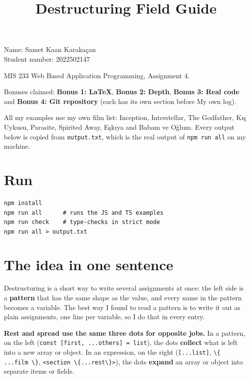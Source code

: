 \documentclass[
]{article}
\title{Destructuring Field Guide}
\author{}
\date{}
\newcommand{\passthrough}[1]{#1}
\begin{document}
\maketitle

{
\setcounter{tocdepth}{3}
\tableofcontents
}
Name: Samet Kaan Karakaçan\\
Student number: 2022502147

MIS 233 Web Based Application Programming, Assignment 4.

Bonuses claimed: \textbf{Bonus 1: LaTeX}, \textbf{Bonus 2: Depth},
\textbf{Bonus 3: Real code} and \textbf{Bonus 4: Git repository} (each
has its own section before My own log).

All my examples use my own film list: Inception, Interstellar, The
Godfather, Kış Uykusu, Parasite, Spirited Away, Eşkıya and Babam ve
Oğlum. Every output below is copied from
\passthrough{\lstinline!output.txt!}, which is the real output of
\passthrough{\lstinline!npm run all!} on my machine.

\hypertarget{run}{%
\section{Run}\label{run}}

\begin{lstlisting}
npm install
npm run all      # runs the JS and TS examples
npm run check    # type-checks in strict mode
npm run all > output.txt
\end{lstlisting}

\hypertarget{the-idea-in-one-sentence}{%
\section{The idea in one sentence}\label{the-idea-in-one-sentence}}

Destructuring is a short way to write several assignments at once: the
left side is a \textbf{pattern} that has the same shape as the value,
and every name in the pattern becomes a variable. The best way I found
to read a pattern is to write it out as plain assignments, one line per
variable, so I do that in every entry.

\textbf{Rest and spread use the same three dots for opposite jobs.} In a
pattern, on the left
(\passthrough{\lstinline!const [first, ...others] = list!}), the dots
\textbf{collect} what is left into a new array or object. In an
expression, on the right (\passthrough{\lstinline![...list]!},
\passthrough{\lstinline!\{ ...film \}!},
\passthrough{\lstinline!<section \{...rest\}>!}), the dots
\textbf{expand} an array or object into separate items or fields.
\end{document}

